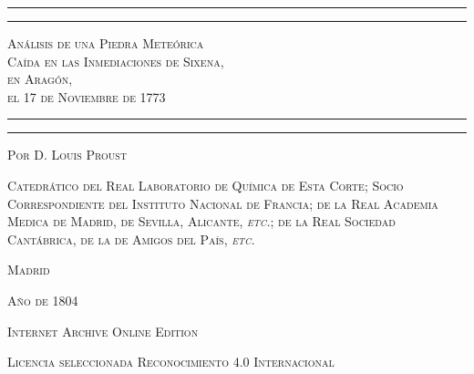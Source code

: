 \documentclass[a4paper, 11pt, oneside, polutonikogreek, spanish]{article}
\begin{document}
\begin{titlepage} %
	\centering %

	
	\rule{\textwidth}{1.6pt}\vspace*{-\baselineskip}\vspace*{2pt} %
	\rule{\textwidth}{0.4pt} %
	
	\vspace{1\baselineskip} %
	
	{\scshape\LARGE Análisis de una Piedra Meteórica \\Caída en las Inmediaciones de Sixena, \\en Aragón, \\el 17 de Noviembre de 1773}
	
	\vspace{1\baselineskip} %

	\rule{\textwidth}{0.4pt}\vspace*{-\baselineskip}\vspace{3.2pt} %
	\rule{\textwidth}{1.6pt} %
	
	\vspace{1\baselineskip} %
	
	
	{\scshape \Large Por D. Louis Proust} %
	
	\vspace*{1\baselineskip} %
	
        {\scshape\normalsize Catedrático del Real Laboratorio de Química de Esta Corte; Socio Correspondiente del Instituto Nacional de Francia; de la Real Academia Medica de Madrid, de Sevilla, Alicante, \emph{etc.}; de la Real Sociedad Cantábrica, de la de Amigos del País, \emph{etc.} } %
    
        \vspace*{\fill}

	\vspace{1\baselineskip}

	{\small\scshape{Madrid}}

	{\small\scshape Año de 1804}
		
	\vspace{0.5\baselineskip} %

        \scshape Internet Archive Online Edition  %
	
	{\scshape\small Licencia seleccionada Reconocimiento 4.0 Internacional} %
\end{titlepage}
\setlength{\parskip}{1mm plus1mm minus1mm}
\clearpage
\large
\end{document}
